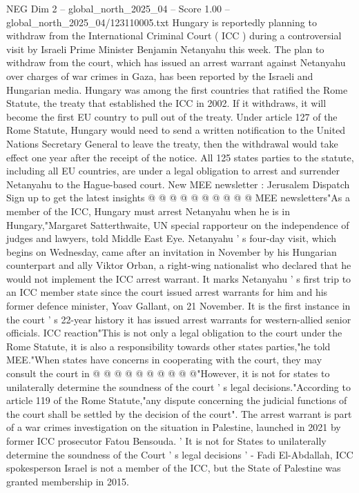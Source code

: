 \begin{textsample}{NEG Dim 2 – global\_north\_2025\_04 – Score 1.00 – global\_north\_2025\_04/123110005.txt}  \label{ex:f2_neg_127}
Hungary is reportedly planning to withdraw from the International Criminal Court ( ICC ) during a controversial visit by Israeli Prime Minister Benjamin Netanyahu this week.
The plan to withdraw from the court, which has issued an arrest warrant against Netanyahu over charges of war crimes in Gaza, has been reported by the Israeli and Hungarian media.
Hungary was among the first countries that ratified the Rome Statute, the treaty that established the ICC in 2002.
If it withdraws, it will become the first EU country to pull out of the treaty.
Under article 127 of the Rome Statute, Hungary would need to send a written notification to the United Nations Secretary General to leave the treaty, then the withdrawal would take effect one year after the receipt of the notice.
All 125 states parties to the statute, including all EU countries, are under a legal obligation to arrest and surrender Netanyahu to the Hague-based court.
New MEE newsletter : Jerusalem Dispatch Sign up to get the latest insights @ @ @ @ @ @ @ @ @ @ MEE newsletters"As a member of the ICC, Hungary must arrest Netanyahu when he is in Hungary,"Margaret Satterthwaite, UN special rapporteur on the independence of judges and lawyers, told Middle East Eye.
Netanyahu ' s four-day visit, which begins on Wednesday, came after an invitation in November by his Hungarian counterpart and ally Viktor Orban, a right-wing nationalist who declared that he would not implement the ICC arrest warrant.
It marks Netanyahu ' s first trip to an ICC member state since the court issued arrest warrants for him and his former defence minister, Yoav Gallant, on 21 November.
It is the first instance in the court ' s 22-year history it has issued arrest warrants for western-allied senior officials.
ICC reaction"This is not only a legal obligation to the court under the Rome Statute, it is also a responsibility towards other states parties,"he told MEE."When states have concerns in cooperating with the court, they may consult the court in @ @ @ @ @ @ @ @ @ @"However, it is not for states to unilaterally determine the soundness of the court ' s legal decisions."According to article 119 of the Rome Statute,"any dispute concerning the judicial functions of the court shall be settled by the decision of the court".
The arrest warrant is part of a war crimes investigation on the situation in Palestine, launched in 2021 by former ICC prosecutor Fatou Bensouda. ' It is not for States to unilaterally determine the soundness of the Court ' s legal decisions ' - Fadi El-Abdallah, ICC spokesperson Israel is not a member of the ICC, but the State of Palestine was granted membership in 2015.

\end{textsample}
